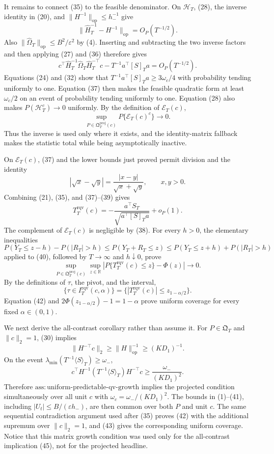 It remains to connect (35) to the feasible denominator. On \(\mathcal H_T\), (28), the inverse identity in (20), and \(\|H^{-1}\|_{\mathrm{op}}\le h_-^{-1}\) give
\[
 \|\widehat H_T^{-1}-H^{-1}\|_{\mathrm{op}}=O_P(T^{-1/2}).
\tag{36}
\]
Also \(\|\widehat\Omega_T\|_{\mathrm{op}}\le B^2/\varepsilon^2\) by (4). Inserting and subtracting the two inverse factors and then applying (27) and (36) therefore gives
\[
 c^\top\widehat H_T^{-1}\widehat\Omega_T\widehat H_T^{-\top}c
 -T^{-1}a^\top[S]_Ta=O_P(T^{-1/2}).
\tag{37}
\]
Equations (24) and (32) show that \(T^{-1}a^\top[S]_Ta\ge3\omega_c/4\) with probability tending uniformly to one. Equation (37) then makes the feasible quadratic form at least \(\omega_c/2\) on an event of probability tending uniformly to one. Equation (28) also makes \(P(\mathcal H_T^c)\to0\) uniformly. By the definition of \(\mathcal E_T(c)\),
\[
 \sup_{P\in\mathfrak Q_T^{\mathrm{proj}}(c)}P\{\mathcal E_T(c)^c\}
 \longrightarrow0.
\tag{38}
\]
Thus the inverse is used only where it exists, and the identity-matrix fallback makes the statistic total while being asymptotically inactive.

On \(\mathcal E_T(c)\), (37) and the lower bounds just proved permit division and the identity
\[
 |\sqrt x-\sqrt y|=\frac{|x-y|}{\sqrt x+\sqrt y},
 \qquad x,y>0.
\tag{39}
\]
Combining (21), (35), and (37)--(39) gives
\[
 T_T^{\mathrm{rqv}}(c)
 =-\frac{a^\top S_T}{\sqrt{a^\top[S]_Ta}}+o_P(1).
\tag{40}
\]
The complement of \(\mathcal E_T(c)\) is negligible by (38). For every \(h>0\), the elementary inequalities
\[
 P(Y_T\le z-h)-P(|R_T|>h)
 \le P(Y_T+R_T\le z)
 \le P(Y_T\le z+h)+P(|R_T|>h)
\tag{41}
\]
applied to (40), followed by \(T\to\infty\) and \(h\downarrow0\), prove
\[
 \sup_{P\in\mathfrak Q_T^{\mathrm{proj}}(c)}\sup_{z\in\mathbb R}
 \left|P\{T_T^{\mathrm{rqv}}(c)\le z\}-\Phi(z)\right|\longrightarrow0.
\tag{42}
\]
By the definitions of \(\tau\), the pivot, and the interval,
\[
 \{\tau\in I_T^{\mathrm{rqv}}(c,\alpha)\}
 =\{|T_T^{\mathrm{rqv}}(c)|\le z_{1-\alpha/2}\}.
\tag{43}
\]
Equation (42) and \(2\Phi(z_{1-\alpha/2})-1=1-\alpha\) prove uniform coverage for every fixed \(\alpha\in(0,1)\).

We next derive the all-contrast corollary rather than assume it. For \(P\in\mathfrak Q_T\) and \(\|c\|_2=1\), (30) implies
\[
 \|H^{-\top}c\|_2\ge\|H\|_{\mathrm{op}}^{-1}
 \ge(KD_1)^{-1}.
\tag{44}
\]
On the event \(\lambda_{\min}(T^{-1}\langle S\rangle_T)\ge\omega_-\),
\[
 c^\top H^{-1}(T^{-1}\langle S\rangle_T)H^{-\top}c
 \ge\frac{\omega_-}{(KD_1)^2}.
\tag{45}
\]
Therefore \(\mathrm{ass:uniform\text{-}predictable\text{-}qv\text{-}growth}\) implies the projected condition simultaneously over all unit \(c\) with \(\omega_c=\omega_-/(KD_1)^2\). The bounds in (1)--(41), including \(|U_t|\le B/(\varepsilon h_-)\), are then common over both \(P\) and unit \(c\). The same sequential contradiction argument used after (35) proves (42) with the additional supremum over \(\|c\|_2=1\), and (43) gives the corresponding uniform coverage. Notice that this matrix growth condition was used only for the all-contrast implication (45), not for the projected headline.

